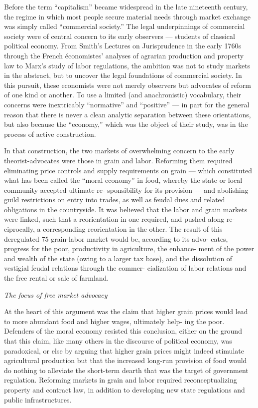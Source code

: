 \documentclass[
]{book}
\begin{document}
Before the term ``capitalism'' became widespread in the late nineteenth
century, the regime in which most people secure material needs
through market exchange was simply called ``commercial society.'' The
legal underpinnings of commercial society were of central concern to
its early observers --- students of classical political economy. From
Smith's Lectures on Jurisprudence in the early 1760s through the
French économistes' analyses of agrarian production and property
law to Marx's study of labor regulations, the ambition was not to
study markets in the abstract, but to uncover the legal foundations of
commercial society. In this pursuit, these economists were not merely
observers but advocates of reform of one kind or another. To use a
limited (and anachronistic) vocabulary, their concerns were inextricably
``normative'' and ``positive'' --- in part for the general reason that
there is never a clean analytic separation between these orientations,
but also because the ``economy,'' which was the object of their study,
was in the process of active construction.

In that construction, the two markets of overwhelming concern to
the early theorist-advocates were those in grain and labor. Reforming
them required eliminating price controls and supply requirements on
grain --- which constituted what has been called the ``moral economy''
in food, whereby the state or local community accepted ultimate re-
sponsibility for its provision --- and abolishing guild restrictions on
entry into trades, as well as feudal dues and related obligations in the
countryside. It was believed that the labor and grain markets were
linked, such that a reorientation in one required, and pushed along re-
ciprocally, a corresponding reorientation in the other. The result of
this deregulated 75 grain-labor market would be, according to its advo-
cates, progress for the poor, productivity in agriculture, the enhance-
ment of the power and wealth of the state (owing to a larger tax base),
and the dissolution of vestigial feudal relations through the commer-
cialization of labor relations and the free rental or sale of farmland.

\emph{The focus of free market advocacy}

At the heart of this argument was the claim that higher grain prices
would lead to more abundant food and higher wages, ultimately help-
ing the poor. Defenders of the moral economy resisted this conclusion,
either on the ground that this claim, like many others in the discourse
of political economy, was paradoxical, or else by arguing that higher
grain prices might indeed stimulate agricultural production but that
the increased long-run provision of food would do nothing to alleviate
the short-term dearth that was the target of government regulation.
Reforming
markets in grain and labor required reconceptualizing property and
contract law, in addition to developing new state regulations and
public infrastructures.
\end{document}
